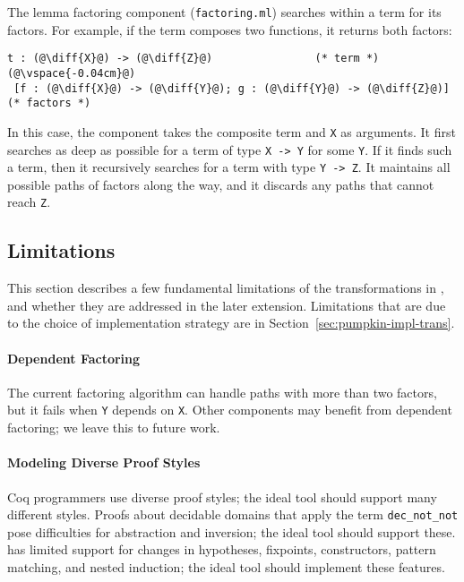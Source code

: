 The lemma factoring component (\lstinline{factoring.ml}) searches within a term
for its factors. For example,
if the term composes two functions, it returns both factors:

\begin{lstlisting}[language=coq]
  t : (@\diff{X}@) -> (@\diff{Z}@)                (* term *)(@\vspace{-0.04cm}@)
 [f : (@\diff{X}@) -> (@\diff{Y}@); g : (@\diff{Y}@) -> (@\diff{Z}@)] (* factors *)
\end{lstlisting}
In this case, the component takes the composite term and \lstinline{X} as arguments.
It first searches as deep as possible for a term of type \lstinline{X -> Y} for some \lstinline{Y}.
If it finds such a term, then it recursively searches for a term with type \lstinline{Y -> Z}. 
It maintains all possible 
paths of factors along the way, and it discards any paths that cannot reach \lstinline{Z}.

\subsection{Limitations}
\label{sec:pumpkin-trans-limitations}

This section describes a few fundamental limitations of the transformations in \sysname,
and whether they are addressed in the later \toolnamec extension.
Limitations that are due to the choice of implementation strategy are in Section~\ref{sec:pumpkin-impl-trans}.

\paragraph{Dependent Factoring} The current factoring algorithm can handle paths
with more than two factors, but it fails when \lstinline{Y} depends on \lstinline{X}.
Other components may benefit from dependent factoring; we leave this to future work.

\paragraph{Modeling Diverse Proof Styles} Coq programmers use diverse proof styles;
the ideal tool should support many different styles.
Proofs about decidable domains that apply the term \lstinline{dec_not_not}
pose difficulties for abstraction and inversion; the ideal tool should support these. 
\sysname has limited support for changes in hypotheses, fixpoints, constructors, 
pattern matching, and nested induction; the ideal tool should implement these features.

